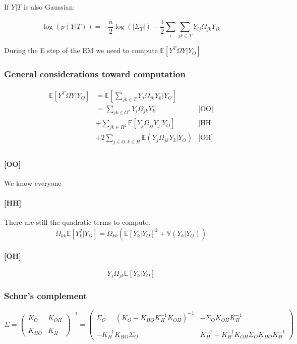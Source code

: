 \documentclass[11pt,a4paper]{article}
\newcommand{\Esp}{\mathds{E}}
\begin{document}
If $Y|T$ is also Gaussian:

$$\log(p(Y|T)) = -\frac{n}{2}\log(|\Sigma_T|) - \frac{1}{2} \sum_i\sum_{jk\in T} Y_{ij} \Omega_{jk} Y_{ik}$$

During the E step of the EM we need to compute $\Esp[Y^T\Omega Y|Y_O]$
\subsubsection{General considerations toward computation}
\begin{align*}
 \Esp[Y^T\Omega Y|Y_O] &=\Esp\left[\sum_{jk\in T } Y_j\Omega_{jk}Y_k|Y_O\right]&\\
& = \sum_{jk\in O^2} Y_i\Omega_{jk} Y_k & \text{[OO]}\\
&+\sum_{jk \in H^2} \Esp[Y_j\Omega_{jj}Y_j|Y_O] & \text{[HH]} \\
&+2 \sum_{j\in O, k \in H} \Esp(Y_j\Omega_{jk} Y_k |Y_O) & \text{[OH]}\\
\end{align*}

\paragraph{[OO]} We know everyone
\paragraph{[HH]} There are still the quadratic terms to compute. 
$$ \Omega_{kk} \Esp[Y_k^2|Y_O] = \Omega_{kk} \left( \Esp [Y_k|Y_O]^2 + \mathds{V}(Y_k|Y_O)\right)$$

\paragraph{[OH]}$$ Y_j\Omega_{jk}\Esp[Y_k|Y_O]$$

\subsubsection{Schur's complement}

\[
 \Sigma=
  \left( {\begin{array}{cc}
  K_O &  K_{OH}\\\\
  K_{HO} & K_H
  \end{array} } \right)^{-1} =
  \left( {\begin{array}{cc}
  \Sigma_O =( K_O - K_{HO}K_H^{-1}K_{OH})^{-1} &  - \Sigma_O K_{OH}K_H^{-1}\\\\
 -K_H^{-1}K_{HO}\Sigma_O & K_H^{-1}+K_H^{-1}K_{OH}\Sigma_OK_{HO}K_H^{-1}
  \end{array} } \right)
  \]
\end{document}
